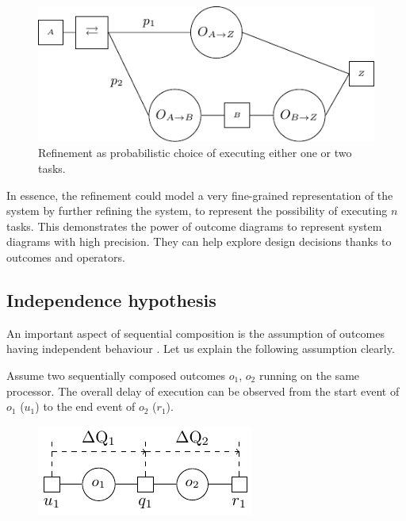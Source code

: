    \begin{figure}[H]
            \begin{center}
                \includegraphics[scale = 1]{tikz/ref_op.pdf}
            \end{center}
            \caption{Refinement as probabilistic choice of executing either one or two tasks.}
            \label{fig:prob_ref}
        \end{figure}
    In essence, the refinement could model a very fine-grained representation of the system by further refining the system, to represent the possibility of executing $n$ tasks. This demonstrates the power of outcome diagrams to represent system diagrams with high precision. They can help explore design decisions thanks to outcomes and operators.

    \subsection{Independence hypothesis}  
        An important aspect of sequential composition is the assumption of outcomes having independent behaviour \cite{post}. Let us explain the following assumption clearly.

        Assume two sequentially composed outcomes $o_1$, $o_2$ running on the same processor. The overall delay of execution can be observed from the start event of $o_1$ ($u_1$) to the end event of $o_2$ ($r_1$). 
        \begin{figure}[H]
            \begin{center}
                \includegraphics[scale=1]{tikz/indep.pdf}
            \end{center}
        \end{figure}
        
